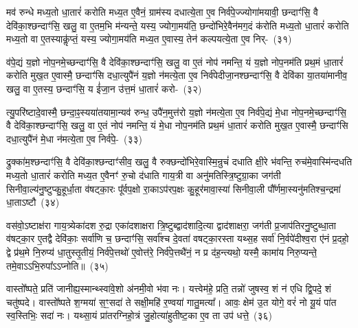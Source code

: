 मव॑ रुन्धे मध्य॒तो धा॒तारं॑ करोति मध्य॒त ए॒वैनं॒ ग्राम॑स्य दधात्ये॒ता ए॒व निर्व॑पे॒ज्ज्योगा॑मयावी॒ छन्दाꣳ॑सि॒ वै देवि॑का॒श्छन्दाꣳ॑सि॒ खलु॒ वा ए॒तम॒भि म॑न्यन्ते॒ यस्य॒ ज्योगा॒मय॑ति॒ छन्दो॑भिरे॒वैन॑मग॒दं क॑रोति मध्य॒तो धा॒तारं॑ करोति मध्य॒तो वा ए॒तस्याकॢ॑प्तं॒ यस्य॒ ज्योगा॒मय॑ति मध्य॒त ए॒वास्य॒ तेन॑ कल्पयत्ये॒ता ए॒व निर्-~(३१)\ip

व॑पे॒द्यं य॒ज्ञो नोप॒नमे॒च्छन्दाꣳ॑सि॒ वै देवि॑का॒श्छन्दाꣳ॑सि॒ खलु॒ वा ए॒तं नोप॑ नमन्ति॒ यं य॒ज्ञो नोप॒नम॑ति प्रथ॒मं धा॒तारं॑ करोति मुख॒त ए॒वास्मै॒ छन्दाꣳ॑सि दधा॒त्युपै॑नं य॒ज्ञो न॑मत्ये॒ता ए॒व निर्व॑पेदीजा॒नश्छन्दाꣳ॑सि॒ वै देवि॑का या॒तया॑मानीव॒ खलु॒ वा ए॒तस्य॒ छन्दाꣳ॑सि॒ य ई॑जा॒न उ॑त्त॒मं धा॒तारं॑ करो-~(३२)\ip

त्यु॒परि॑ष्टादे॒वास्मै॒ छन्दा॒ꣴ॒स्यया॑तयामा॒न्यव॑ रुन्ध॒ उपै॑न॒मुत्त॑रो य॒ज्ञो न॑मत्ये॒ता ए॒व निर्व॑पे॒द्यं मे॒धा नोप॒नमे॒च्छन्दाꣳ॑सि॒ वै देवि॑का॒श्छन्दाꣳ॑सि॒ खलु॒ वा ए॒तं नोप॑ नमन्ति॒ यं मे॒धा नोप॒नम॑ति प्रथ॒मं धा॒तारं॑ करोति मुख॒त ए॒वास्मै॒ छन्दाꣳ॑सि दधा॒त्युपै॑नं मे॒धा न॑मत्ये॒ता ए॒व निर्व॑पे॒-~(३३)\ip

द्रुक्का॑म॒श्छन्दाꣳ॑सि॒ वै देवि॑का॒श्छन्दाꣳ॑सीव॒ खलु॒ वै रुक्छन्दो॑भिरे॒वास्मि॒न्रुचं॑ दधाति क्षी॒रे भ॑वन्ति॒ रुच॑मे॒वास्मि॑न्दधति मध्य॒तो धा॒तारं॑ करोति मध्य॒त ए॒वैनꣳ॑ रु॒चो द॑धाति गाय॒त्री वा अनु॑मतिस्त्रि॒ष्टुग्रा॒का जग॑ती सिनीवा॒ल्य॑नु॒ष्टुप्कु॒हूर्धा॒ता व॑षट्का॒रः पू᳚र्वप॒क्षो रा॒का\-ऽप॑रप॒क्षः कु॒हूर॑मावा॒स्या॑ सिनीवा॒ली पौ᳚र्णमा॒स्यनु॑\-मतिश्च॒न्द्रमा॑ धा॒ता\-ऽष्टौ~(३४)\ip

वस॑वो॒\-ऽष्टाक्ष॑रा गाय॒त्र्येका॑\-दश रु॒द्रा एका॑\-दशाक्षरा त्रि॒ष्टुब्द्वाद॑शादि॒त्या द्वाद॑शाक्षरा॒ जग॑ती प्र॒जा\-प॑तिरनु॒ष्टुब्धा॒ता व॑षट्का॒र ए॒तद्वै देवि॑काः॒ सर्वा॑णि च॒ छन्दाꣳ॑सि॒ सर्वा᳚श्च दे॒वता॑ वषट्का॒रस्ता यथ्स॒ह सर्वा॑ नि॒र्वपे॑दीश्व॒रा ए॑नं प्र॒दहो॒ द्वे प्र॑थ॒मे नि॒रुप्य॑ धा॒तुस्तृ॒तीयं॒ निर्व॑पे॒त्तथो॑ ए॒वोत्त॑रे॒ निर्व॑पे॒त्तथै॑नं॒ न प्र द॑ह॒न्त्यथो॒ यस्मै॒ कामा॑य निरु॒प्यन्ते॒ तमे॒वा\-ऽऽ\-भि॒रुपा᳚\-ऽऽ\-प्नोति॥~(३५)\ip

{\anuvakamend[{प॒शुका॑म॒श्छन्दाꣳ॑सि॒ वै देवि॑का॒श्छन्दाꣳ॑सि॒ ग्राम॑ङ्कल्पयत्ये॒ता ए॒व निरु॑त्त॒मन्धा॒तारं॑ करोति मे॒धा न॑मत्ये॒ता ए॒व निर्व॑पेद॒ष्टौ द॑हन्ति॒ नव॑ च॥ देविकाः प्रजाकामो मिथुनी पशुकाम}]}

वास्तो᳚ष्पते॒ प्रति॑ जानीह्य॒स्मान्थ्\-स्वा॑वे॒शो अ॑नमी॒वो भ॑वा नः। यत्त्वेम॑हे॒ प्रति॒ तन्नो॑ जुषस्व॒ शं न॑ एधि द्वि॒पदे॒ शं चतु॑ष्पदे। वास्तो᳚ष्पते श॒ग्मया॑ स॒ꣳ॒सदा॑ ते सक्षी॒महि॑ र॒ण्वया॑ गातु॒मत्या᳚। आवः॒ क्षेम॑ उ॒त योगे॒ वरं॑ नो यू॒यं पा॑त स्व॒स्तिभिः॒ सदा॑ नः। यथ्सा॒यं प्रा॑तरग्निहो॒त्रं जु॒होत्या॑हुतीष्ट॒का ए॒व ता उप॑ धत्ते॒~(३६)\ip

